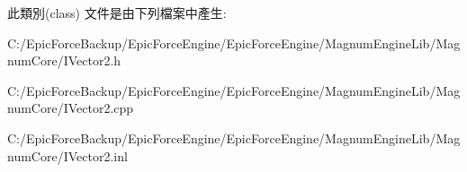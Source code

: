 此類別(class) 文件是由下列檔案中產生\+:\begin{DoxyCompactItemize}
\item 
C\+:/\+Epic\+Force\+Backup/\+Epic\+Force\+Engine/\+Epic\+Force\+Engine/\+Magnum\+Engine\+Lib/\+Magnum\+Core/I\+Vector2.\+h\item 
C\+:/\+Epic\+Force\+Backup/\+Epic\+Force\+Engine/\+Epic\+Force\+Engine/\+Magnum\+Engine\+Lib/\+Magnum\+Core/I\+Vector2.\+cpp\item 
C\+:/\+Epic\+Force\+Backup/\+Epic\+Force\+Engine/\+Epic\+Force\+Engine/\+Magnum\+Engine\+Lib/\+Magnum\+Core/I\+Vector2.\+inl\end{DoxyCompactItemize}
